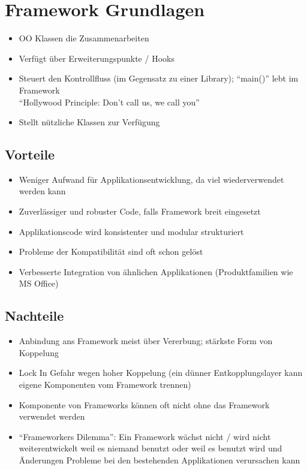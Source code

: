 \section{Framework Grundlagen}

\begin{itemize}
	\item OO Klassen die Zusammenarbeiten
	\item Verfügt über Erweiterungspunkte / Hooks
	\item Steuert den Kontrollfluss (im Gegensatz zu einer Library); ``main()'' lebt im Framework \\
		``Hollywood Principle: Don't call us, we call you''
	\item Stellt nützliche Klassen zur Verfügung
\end{itemize}

\subsection*{Vorteile}

\begin{itemize}
	\item Weniger Aufwand für Applikationsentwicklung, da viel wiederverwendet werden kann
	\item Zuverlässiger und robuster Code, falls Framework breit eingesetzt
	\item Applikationscode wird konsistenter und modular strukturiert
	\item Probleme der Kompatibilität sind oft schon gelöst
	\item Verbesserte Integration von ähnlichen Applikationen (Produktfamilien wie MS Office)
\end{itemize}

\subsection*{Nachteile}

\begin{itemize}
	\item Anbindung ans Framework meist über Vererbung; stärkste Form von Koppelung
	\item Lock In Gefahr wegen hoher Koppelung (ein dünner Entkopplungslayer kann eigene Komponenten vom Framework trennen)
	\item Komponente von Frameworks können oft nicht ohne das Framework verwendet werden
	\item ``Frameworkers Dilemma'': Ein Framework wächst nicht / wird nicht weiterentwickelt weil es niemand benutzt oder weil es benutzt wird und Änderungen Probleme bei den bestehenden Applikationen verursachen kann
\end{itemize}

